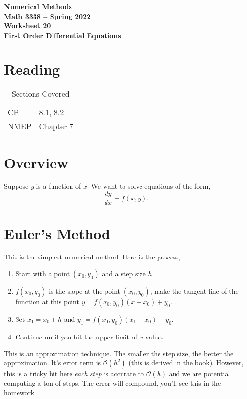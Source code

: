 \documentclass[11pt,letterpaper]{article}
\newcommand{\semester}{Spring 2022}
\newcommand{\bigo}{\mathcal{O}}
\begin{document}
\begin{center}
{\huge{\bf  Numerical Methods}} \\[1.5ex]
{\bf Math 3338 -- \semester}\\[1.5ex]
{\Large{\bf Worksheet 20\ \\[2ex] First Order Differential Equations}}\\
\end{center}
\vspace{2mm}


\section{Reading}

\begin{table}[!ht]
 \centering
 \begin{tabular}{ll}
   CP &  8.1, 8.2 \\
 NMEP &  Chapter 7
 \end{tabular}
\caption{Sections Covered}
\end{table}

\section{Overview}
Suppose $y$ is a function of $x$. We want to solve equations of the form,
\[
\frac{dy}{dx} = f(x,y).
\]

\section{Euler's Method}
This is the simplest numerical method. Here is the process,
\begin{enumerate}
 \item Start with a point $(x_0,y_0)$ and a step size $h$
 \item $f(x_{0},y_{0})$ is the slope at the point $(x_{0},y_{0})$, make the tangent line of the
function at this point $y=f(x_0,y_0)(x-x_0)+y_0$.
 \item Set $x_1 = x_0+h$ and $y_1 = f(x_0,y_0)(x_1-x_0)+y_0$.
 \item Continue until you hit the upper limit of $x$-values.
\end{enumerate}

This is an approximation technique. The smaller the step size, the better the approximation. It's
error term is $\bigo(h^2)$ (this is derived in the book). However, this is a tricky bit here
\emph{each step} is accurate to $\bigo(h)$ and we are potential computing a ton of steps. The error
will compound, you'll see this in the homework. 
\end{document}
